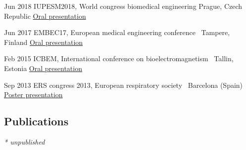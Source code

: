 \documentclass[letterpaper]{twentysecondcv} %
\begin{document}
\begin{RigthPage2}
\begin{twenty}
	\twentyitem
    	{Jun 2018}
        {IUPESM2018, World congress biomedical engineering}
        {Prague, Czech Republic}
        {\href{https://www.slideshare.net/slideshow/embed_code/key/z0l5pXuzNVj5EG}{Oral presentation}}
        

	\twentyitem
    	{Jun 2017}
        {EMBEC17, European medical engineering conference~\cite{nlpf}}
        {Tampere, Finland}
        {\href{https://www.slideshare.net/slideshow/embed_code/key/34qLaFcP2gR6ji}{Oral presentation}}
      

	\twentyitem
    	{Feb 2015}
        {ICBEM, International conference on bioelectromagnetism~\cite{iosc}}
        {Tallin, Estonia}
         {\href{https://www.slideshare.net/slideshow/embed_code/key/bRO5NrltJZFizD}{Oral presentation} }       
               

	\twentyitem
    	{Sep 2013}
        {ERS congress 2013, European respiratory society~\cite{iosers}}
        {Barcelona (Spain)}
        {\href{http://www.ers-education.org/Media/Media.aspx?idMedia=228641}{Poster presentation}  }      
        
        
\end{twenty}    
\end{RigthPage2}
      
        


\begin{downPubli}

\section{Publications}

\nocite{*}

\printbibliography[heading=none,title={}]

\begin{flushright}
\textit{* unpublished}
\end{flushright}
\end{downPubli}
\end{document}
